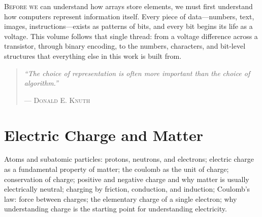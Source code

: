 %

\begin{volumeintro}
\lettrine[lines=3]{B}{efore we} can understand how arrays store elements, we must first understand how computers represent information itself. Every piece of data---numbers, text, images, instructions---exists as patterns of bits, and every bit begins its life as a voltage. This volume follows that single thread: from a voltage difference across a transistor, through binary encoding, to the numbers, characters, and bit-level structures that everything else in this work is built from.

\begin{quote}
\textit{``The choice of representation is often more important than the choice of algorithm.''}

\hfill--- \textsc{Donald E. Knuth}
\end{quote}
\end{volumeintro}

 





\chapter{Electric Charge and Matter}
\label{ch:electric-charge}

Atoms and subatomic particles: protons, neutrons, and electrons; electric
charge as a fundamental property of matter; the coulomb as the unit of
charge; conservation of charge; positive and negative charge and why matter
is usually electrically neutral; charging by friction, conduction, and
induction; Coulomb's law: force between charges; the elementary charge of a
single electron; why understanding charge is the starting point for
understanding electricity.


